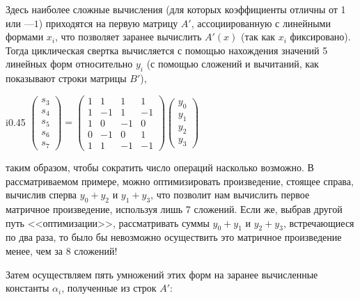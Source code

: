 \documentclass{mai_book}
\begin{document}
Здесь наиболее сложные вычисления (для которых коэффициенты отличны от 1 или $—1$) приходятся на первую матрицу $A'$, ассоциированную с линейными формами $x_i$, что позволяет заранее вычислить $A'(x)$ (так как $x_i$ фиксировано). Тогда циклическая свертка вычисляется с помощью нахождения значений 5 линейных форм относительно $y_i$ (с помощью сложений и вычитаний, как показывают строки матрицы $B'$),\begin{wrapfigure}{i}{0.45\textwidth}
$\begin{pmatrix} s_3 \\ s_4 \\ s_5 \\ s_6 \\ s_7 \end{pmatrix} = \begin{pmatrix} 1 & 1 & 1 & 1 \\ 1 & -1 & 1 & -1 \\ 1 & 0 & -1 & 0 \\ 0 & -1 & 0 & 1 \\ 1 & 1 & -1 & -1 \end{pmatrix} \begin{pmatrix} y_0 \\ y_1 \\ y_2 \\ y_3 \end{pmatrix}$
\end{wrapfigure} таким образом, чтобы сократить число операций насколько
возможно. В рассматриваемом примере, можно оптимизировать произведение, стоящее справа, вычислив сперва $y_0 + y_2$ и $y_1+y_3$, что позволит нам вычислить первое матричное произведение, используя лишь 7 сложений. Если же, выбрав другой путь <<оптимизации>>, рассматривать суммы $y_0+y_1$ и $y_2+y_3$, встречающиеся по два раза, то было бы невозможно осуществить это матричное произведение менее, чем за 8 сложений!\par
Затем осуществляем пять умножений этих форм на заранее вычисленные константы $\alpha_i$, полученные из строк $A'$:\par 
\end{document}
